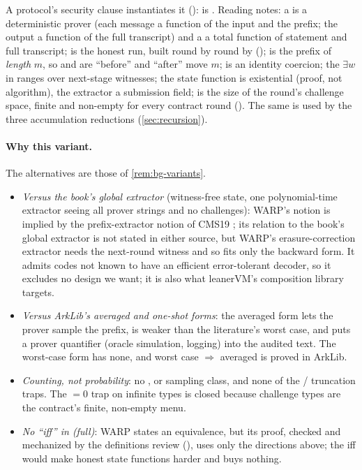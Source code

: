 \noindent A protocol's security clause instantiates it ():
 is .
Reading notes: a  is a deterministic prover (each message a function of the input
and the prefix; the output a function of the full transcript) and a  a total
function of statement and full transcript;  is the honest run, built round by round by
 ();  is the prefix of \emph{length} $m$, so
 and  are \enquote{before} and \enquote{after} move $m$;  is an identity coercion; the $\exists w$ in  ranges over next-stage witnesses;
the state function is existential (proof, not algorithm), the extractor a submission field;
 is the size of the round's challenge space, finite and non-empty for
every contract round (). The same  is used by the
three accumulation reductions (\cref{sec:recursion}).

\paragraph{Why this variant.} The alternatives are those of \cref{rem:bg-variants}.
\begin{itemize}[nosep]
\item \emph{Versus the book's global extractor} \cite[Def.~31.1.6]{CY24-Book} (witness-free state,
  one polynomial-time extractor seeing all prover strings and no challenges): WARP's notion is
  implied by the prefix-extractor notion of CMS19 \cite[App.~C]{BCFW25-WARP}; its relation to the
  book's global extractor is not stated in either source, but WARP's erasure-correction extractor
  needs the next-round witness and so fits only the backward form. It admits codes not known to
  have an efficient error-tolerant decoder, so it excludes no design we want; it is also what
  leanerVM's composition library targets.
\item \emph{Versus ArkLib's averaged and one-shot forms}: the averaged form lets the prover sample
  the prefix, is weaker than the literature's worst case, and puts a prover quantifier (oracle
  simulation, logging) into the audited text. The worst-case form has none, and worst case
  $\Rightarrow$ averaged is proved in ArkLib.
\item \emph{Counting, not probability}: no ,  or sampling class, and none of
  the / truncation traps. The ${}=0$ trap on infinite
  types is closed because challenge types are the contract's finite, non-empty menu.
\item \emph{No \enquote{iff} in \textsf{(full)}}: WARP states an equivalence, but its proof, checked
  and mechanized by the definitions review (), uses only the directions above;
  the iff would make honest state functions harder and buys nothing.
\end{itemize}

